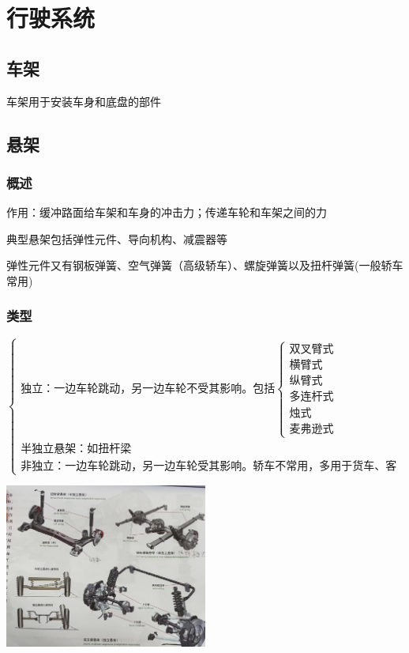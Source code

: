 \section{行驶系统}
	\subsection{车架}
		车架用于安装车身和底盘的部件
	\subsection{悬架}
		\subsubsection{概述}
			作用：缓冲路面给车架和车身的冲击力；传递车轮和车架之间的力
			
			典型悬架包括弹性元件、导向机构、减震器等
			
			弹性元件又有钢板弹簧、空气弹簧（高级轿车）、螺旋弹簧以及扭杆弹簧(一般轿车常用)
		\subsubsection{类型}
			\begin{equation*}
				\begin{cases}
					\text{独立：一边车轮跳动，另一边车轮不受其影响。包括}\begin{cases}
						\text{双叉臂式} \\
						\text{横臂式} \\
						\text{纵臂式} \\
						\text{多连杆式} \\
						\text{烛式} \\
						\text{麦弗逊式}
					\end{cases} \\
					\text{半独立悬架：如扭杆梁} \\
					\text{非独立：一边车轮跳动，另一边车轮受其影响。轿车不常用，多用于货车、客车。如钢板弹簧悬架}
				\end{cases}
			\end{equation*}
			\begin{center}
				\includegraphics[width=0.5\textwidth]{3-23}
			\end{center}
